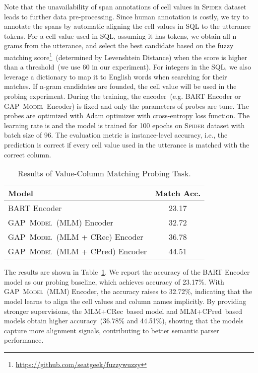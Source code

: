 \documentclass[letterpaper]{article} \usepackage{aaai21}  \usepackage{times}  \usepackage{helvet} \usepackage{courier}  \usepackage[hyphens]{url}  \usepackage{graphicx} \usepackage{booktabs}
\newcommand{\modelnamelm}{\textsc{GAP~Model}}
\newcommand{\colpred}{CPred}
\newcommand{\colrec}{CRec}
\begin{document}
Note that the unavailability of span annotations of cell values in \textsc{Spider} dataset leads to further data pre-processing.
Since human annotation is costly, we try to annotate the spans by automatic aligning the cell values in SQL to the utterance tokens.
For a cell value used in SQL, assuming it has  tokens, we obtain all n-grams from the utterance, and select the best candidate based on the fuzzy matching score\footnote{\url{https://github.com/seatgeek/fuzzywuzzy}}~(determined by Levenshtein Distance) when the score is higher than a threshold~(we use 60 in our experiment). 
For integers in the SQL, we also leverage a dictionary to map it to English words when searching for their matches.
If n-gram candidates are founded, the cell value will be used in the probing experiment.
During the training, the encoder~(e.g. BART Encoder or \modelnamelm~Encoder) is fixed and only the parameters of probes are tune.
The probes are optimized with Adam optimizer with cross-entropy loss function.
The learning rate is  and the model is trained for 100 epochs on \textsc{Spider} dataset with batch size of 96.
The evaluation metric is instance-level accuracy, i.e., the prediction is correct if every cell value used in the utterance is matched with the correct column.

\begin{table}[t]
  \centering
  \small
    \begin{tabular}{lc}
    \toprule
    Model & \multicolumn{1}{l}{Match Acc.} \\
    \midrule
    BART Encoder   & 23.17 \\
    \midrule
    \modelnamelm~(MLM) Encoder &  32.72 \\
    \modelnamelm~(MLM + CRec) Encoder & 36.78 \\
    \modelnamelm~(MLM + CPred) Encoder & 44.51 \\
    \bottomrule
    \end{tabular}\caption{Results of Value-Column Matching Probing Task.}
  \label{tab:analysis:colprobing}\vspace{-0.3cm}
\end{table}

The results are shown in Table~\ref{tab:analysis:colprobing}.
We report the accuracy of the BART Encoder model as our probing baseline, which achieves accuracy of 23.17\%.
With \modelnamelm~(MLM) Encoder, the accuracy raises to 32.72\%, indicating that the model learns to align the cell values and column names implicitly.
By providing stronger supervisions, the MLM+\colrec~based model and MLM+\colpred~based models obtain higher accuracy~(36.78\% and 44.51\%),
showing that the models capture more alignment signals, contributing to better semantic parser performance.
\end{document}

